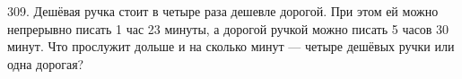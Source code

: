 309. Дешёвая ручка стоит в четыре раза дешевле дорогой. При этом ей можно непрерывно писать 1 час 23 минуты, а дорогой ручкой можно писать 5 часов 30 минут. Что прослужит дольше и на сколько минут --- четыре дешёвых ручки или одна дорогая?\\
